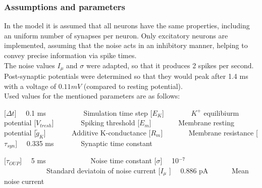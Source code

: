 \documentclass[12pt,a4paper, bibliography=totoc, listof=numbered, footexclude, BCOR=8.25mm, twoside]{scrartcl}
\newcommand{\acrounit}[1]{
  \acroextra{\makebox[18mm][l]{\si[]{#1}}}}
\begin{document}
  \subsubsection*{Assumptions and parameters}
  In the model it is assumed that all neurons have the same properties, including an uniform number of synapses per neuron.
  Only excitatory neurons are implemented, assuming that the noise acts in an inhibitory manner, helping to convey precise information via spike times.\\
  The noise values $I_{\mu}$ and $\sigma$ were adapted, so that it produces 2 spikes per second.
   Post-synaptic potentials were determined so that they would peak after 1.4 ms with a voltage of $0.11 mV$ (compared to resting potential). \\
  Used values for the mentioned parameters are as follows:
   \begin{acronym}[LONGEST]
      [\ensuremath{\Delta t}]{ \ \ 0.1 ms \ \ \ \ \ \ \ \ \ \ Simulation time step }
	 [\ensuremath{E_K}]{ \acrounit{-77 mV} \ \ \  \ \ \ \ $K^+$ equilibiurm potential }
	 [\ensuremath{V_{tresh}}]{ \acrounit{-55 mV} \ \ \  \ \ \ \ Spiking threshold }		
     [\ensuremath{E_m}]{ \acrounit{-70 mV} \ \ \  \ \ \ \ Membrane resting potential}
     [${\tilde{g}}_K$]{ \ \acrounit{5 nS}   \ \  \  \ \ Additive K-conductance} 
     [$R_m$]{ \ \acrounit{10$^7$ \ohm}   \ \  \  \ \ Membrane resistance}
     [\ensuremath{\tau_{syn} }]{ \ \ 0.335 ms \ \  \ \ \ \ \ Synaptic time constant }
 
     [\ensuremath{\tau_{OUP} }]{ \ \ 5 ms \ \ \ \ \ \  \   \ \ \ \ \ Noise time constant }
     [\ensuremath{\sigma }]{ \ \ 10$^{-7}$ \ \ \  \ \ \ \ \ \ \ \ \ Standard deviatoin of noise current }
      [\ensuremath{I_{\mu}} ]{ \ \  0.886 pA \ \  \ \ \   \ Mean noise current  }
              
          
               
  
     
    \end{acronym}
 
  
\end{document}
